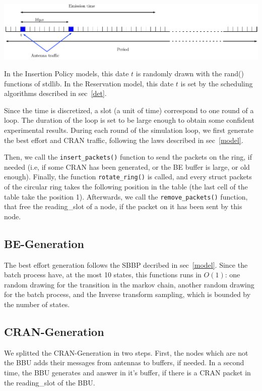 \documentclass[a4paper,10pt]{article}
\begin{document}
\begin{center}   

      \includegraphics[width=\textwidth]{emission_antenna.pdf}

  
\end{center}

	 In the Insertion Policy models, this date $t$ is randomly drawn with the rand() functions of stdlib. In the Reservation model, this date $t$ is set by the scheduling algorithms described in sec~\ref{det}.
	
	Since the time is discretized, a slot (a unit of time) correspond to one round of a loop. The duration of the loop is set to be large enough to obtain some confident experimental results. During each round of the simulation loop, we first generate the best effort and CRAN traffic, following the laws described in sec~\ref{model}.
	
	Then, we call the \texttt{insert\_packets()} function to send the packets on the ring, if needed (i.e, if some CRAN has been generated, or the BE buffer is large, or old enough).
	Finally, the function \texttt{rotate\_ring()} is called, and every struct packets of the circular ring takes the following position in the table (the last cell of the table take the position 1).
	Afterwards, we call the \texttt{remove\_packets()} function, that free the reading\_slot of a node, if the packet on it has been sent by this node.
	\subsection{BE-Generation}
	The best effort generation follows the SBBP decribed in sec~\ref{model}. Since the batch process have, at the most 10 states, this functions runs in $O(1)$: one random drawing for the transition in the markov chain, another random drawing for the batch process, and the Inverse transform sampling, which is bounded by the number of states.
	\subsection{CRAN-Generation}
	We splitted the CRAN-Generation in two steps. First, the nodes which are not the BBU adds their messages from antennas to buffers, if needed. In a second time, the BBU generates and answer in it's buffer, if there is a CRAN packet in the reading\_slot of the BBU.
\end{document}
